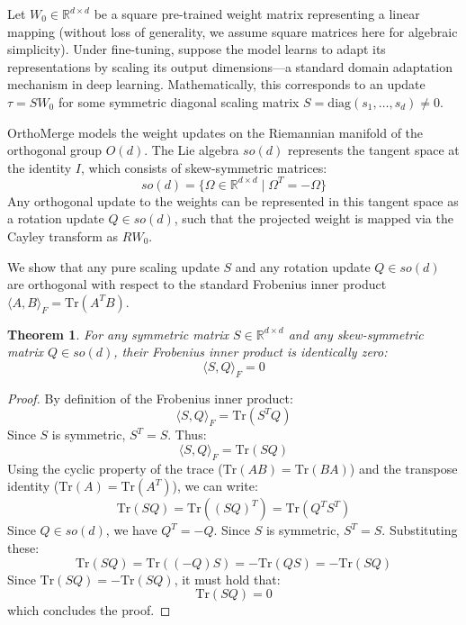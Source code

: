 \documentclass{article}
\newtheorem{theorem}{Theorem}
\begin{document}
Let $W_0 \in \mathbb{R}^{d \times d}$ be a square pre-trained weight matrix representing a linear mapping (without loss of generality, we assume square matrices here for algebraic simplicity). Under fine-tuning, suppose the model learns to adapt its representations by scaling its output dimensions—a standard domain adaptation mechanism in deep learning. Mathematically, this corresponds to an update $\tau = S W_0$ for some symmetric diagonal scaling matrix $S = \text{diag}(s_1, \dots, s_d) \neq 0$.

OrthoMerge models the weight updates on the Riemannian manifold of the orthogonal group $O(d)$. The Lie algebra $so(d)$ represents the tangent space at the identity $I$, which consists of skew-symmetric matrices:
\begin{equation}
    so(d) = \{ \Omega \in \mathbb{R}^{d \times d} \mid \Omega^T = -\Omega \}
\end{equation}
Any orthogonal update to the weights can be represented in this tangent space as a rotation update $Q \in so(d)$, such that the projected weight is mapped via the Cayley transform as $R W_0$.

We show that any pure scaling update $S$ and any rotation update $Q \in so(d)$ are orthogonal with respect to the standard Frobenius inner product $\langle A, B \rangle_F = \text{Tr}(A^T B)$.

\begin{theorem}
For any symmetric matrix $S \in \mathbb{R}^{d \times d}$ and any skew-symmetric matrix $Q \in so(d)$, their Frobenius inner product is identically zero:
\begin{equation}
    \langle S, Q \rangle_F = 0
\end{equation}
\end{theorem}

\begin{proof}
By definition of the Frobenius inner product:
\begin{equation}
    \langle S, Q \rangle_F = \text{Tr}(S^T Q)
\end{equation}
Since $S$ is symmetric, $S^T = S$. Thus:
\begin{equation}
    \langle S, Q \rangle_F = \text{Tr}(S Q)
\end{equation}
Using the cyclic property of the trace ($\text{Tr}(A B) = \text{Tr}(B A)$) and the transpose identity ($\text{Tr}(A) = \text{Tr}(A^T)$), we can write:
\begin{equation}
    \text{Tr}(S Q) = \text{Tr}((S Q)^T) = \text{Tr}(Q^T S^T)
\end{equation}
Since $Q \in so(d)$, we have $Q^T = -Q$. Since $S$ is symmetric, $S^T = S$. Substituting these:
\begin{equation}
    \text{Tr}(S Q) = \text{Tr}((-Q) S) = -\text{Tr}(Q S) = -\text{Tr}(S Q)
\end{equation}
Since $\text{Tr}(S Q) = -\text{Tr}(S Q)$, it must hold that:
\begin{equation}
    \text{Tr}(S Q) = 0
\end{equation}
which concludes the proof.
\end{proof}
\end{document}
